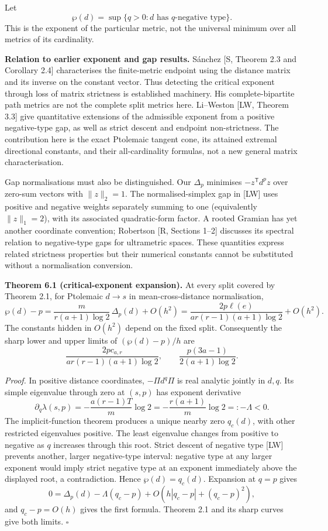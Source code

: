 \documentclass[11pt,a4paper]{article}
\begin{document}
Let \[\wp(d)=\sup\{q>0:d\text{ has }q\text{-negative type}\}.\] This is
the exponent of the particular metric, not the universal minimum over
all metrics of its cardinality.

\textbf{Relation to earlier exponent and gap results.} Sánchez {[}S,
Theorem 2.3 and Corollary 2.4{]} characterises the finite-metric
endpoint using the distance matrix and its inverse on the constant
vector. Thus detecting the critical exponent through loss of matrix
strictness is established machinery. His complete-bipartite path metrics
are not the complete split metrics here. Li--Weston {[}LW, Theorem
3.3{]} give quantitative extensions of the admissible exponent from a
positive negative-type gap, as well as strict descent and endpoint
non-strictness. The contribution here is the exact Ptolemaic tangent
cone, its attained extremal directional constants, and their
all-cardinality formulas, not a new general matrix characterisation.

Gap normalisations must also be distinguished. Our \(\Delta_p\)
minimises \(-z^{\mathsf T}d^p z\) over zero-sum vectors with
\(\|z\|_2=1\). The normalised-simplex gap in {[}LW{]} uses positive and
negative weights separately summing to one (equivalently \(\|z\|_1=2\)),
with its associated quadratic-form factor. A rooted Gramian has yet
another coordinate convention; Robertson {[}R, Sections 1--2{]}
discusses its spectral relation to negative-type gaps for ultrametric
spaces. These quantities express related strictness properties but their
numerical constants cannot be substituted without a normalisation
conversion.

\textbf{Theorem 6.1 (critical-exponent expansion).} At every split
covered by Theorem 2.1, for Ptolemaic \(d\to s\) in mean-cross-distance
normalisation,
\[\boxed{\wp(d)-p=\frac{m}{r(a+1)\log2}\,\Delta_p(d)+O(h^2)
=\frac{2p\ell(e)}{ar(r-1)(a+1)\log2}+O(h^2).}\] The constants hidden in
\(O(h^2)\) depend on the fixed split. Consequently the sharp lower and
upper limits of \((\wp(d)-p)/h\) are
\[\boxed{\frac{2p c_{a,r}}{ar(r-1)(a+1)\log2},
\qquad\frac{p(3a-1)}{2(a+1)\log2}.}\]

\emph{Proof.} In positive distance coordinates, \(-\Pi d^q\Pi\) is real
analytic jointly in \(d,q\). Its simple eigenvalue through zero at
\((s,p)\) has exponent derivative \[\partial_q\lambda(s,p)
=-\frac{a(r-1)T}{m}\log2
=-\frac{r(a+1)}m\log2=:-\Lambda<0.\] The implicit-function theorem
produces a unique nearby zero \(q_c(d)\), with other restricted
eigenvalues positive. The least eigenvalue changes from positive to
negative as \(q\) increases through this root. Strict descent of
negative type {[}LW{]} prevents another, larger negative-type interval:
negative type at any larger exponent would imply strict negative type at
an exponent immediately above the displayed root, a contradiction. Hence
\(\wp(d)=q_c(d)\). Expansion at \(q=p\) gives
\[0=\Delta_p(d)-\Lambda(q_c-p)+O(h|q_c-p|+(q_c-p)^2),\] and
\(q_c-p=O(h)\) gives the first formula. Theorem 2.1 and its sharp curves
give both limits. \(\square\)
\end{document}

